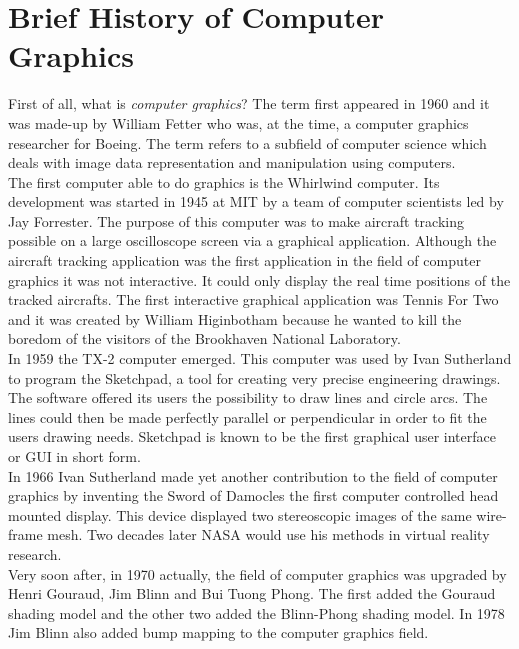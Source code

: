 \section{Brief History of Computer Graphics}
First of all, what is \textit{computer graphics}? The term first appeared in 1960 and it was made-up by William Fetter who was, at the time, a computer graphics researcher for Boeing. The term refers to a subfield of computer science which deals with image data representation and manipulation using computers.\\

The first computer able to do graphics is the Whirlwind computer. Its development was started in 1945 at MIT by a team of computer scientists led by Jay Forrester. The purpose of this computer was to make aircraft tracking possible on a large oscilloscope screen via a graphical application. Although the aircraft tracking application was the first application in the field of computer graphics it was not interactive. It could only display the real time positions of the tracked aircrafts. The first interactive graphical application was Tennis For Two and it was created by William Higinbotham because he wanted to kill the boredom of the visitors of the Brookhaven National Laboratory.\\

In 1959 the TX-2 computer emerged. This computer was used by Ivan Sutherland to program the Sketchpad, a tool for creating very precise engineering drawings. The software offered its users the possibility to draw lines and circle arcs. The lines could then be made perfectly parallel or perpendicular in order to fit the users drawing needs. Sketchpad is known to be the first graphical user interface or GUI in short form.\\

In 1966 Ivan Sutherland made yet another contribution to the field of computer graphics by inventing the Sword of Damocles the first computer controlled head mounted display. This device displayed two stereoscopic images of the same wire-frame mesh. Two decades later NASA would use his methods in virtual reality research.\\

Very soon after, in 1970 actually, the field of computer graphics was upgraded by Henri Gouraud, Jim Blinn and Bui Tuong Phong. The first added the Gouraud shading model and the other two added the Blinn-Phong shading model. In 1978 Jim Blinn also added bump mapping to the computer graphics field.\\
\newpage
